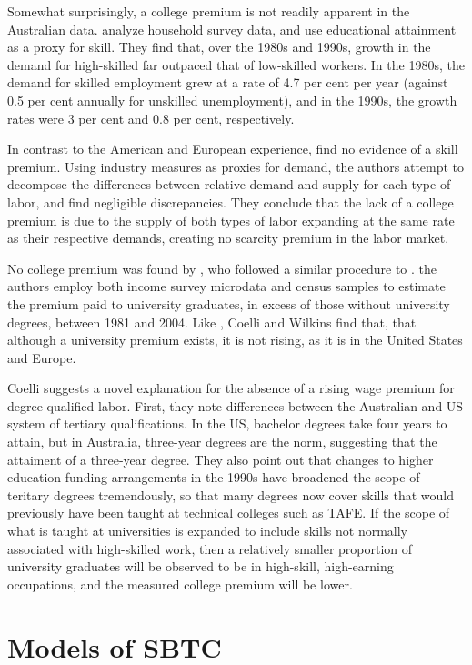 Somewhat surprisingly, a college premium is not readily apparent in the Australian data. \citet{Barnes2002} analyze household survey data, and use educational attainment as a proxy for skill. They find that, over the 1980s and 1990s, growth in the demand for high-skilled far outpaced that of low-skilled workers. In the 1980s, the demand for skilled employment grew at a rate of 4.7 per cent per year (against 0.5 per cent annually for unskilled unemployment), and in the 1990s, the growth rates were 3 per cent and 0.8 per cent, respectively.

In contrast to the American and European experience, \citet{Barnes2002} find no evidence of a skill premium. Using industry measures as proxies for demand, the authors attempt to decompose the differences between relative demand and supply for each type of labor, and find negligible discrepancies. They conclude that the lack of a college premium  is due to the supply of both types of labor expanding at the same rate as their respective demands, creating no scarcity premium in the labor market.

No college premium was found by \citet{Coelli2009}, who followed a similar procedure to \citet{Katz1992}. the authors employ both income survey microdata and census samples to estimate the premium paid to university graduates, in excess of those without university degrees, between 1981 and 2004. Like \citet{Barnes2002}, Coelli and Wilkins find that, that although a university premium exists, it is not rising, as it is in the United States and Europe.

Coelli suggests a novel explanation for the absence of a rising wage premium for degree-qualified labor. First, they note differences between the Australian and US system of tertiary qualifications. In the US, bachelor degrees take four years to attain, but in Australia, three-year degrees are the norm, suggesting that the attaiment of a three-year degree. They also point out that changes to higher education funding arrangements in the 1990s have broadened the scope of teritary degrees tremendously, so that many degrees now cover skills that would previously have been taught at technical colleges such as TAFE. If the scope of what is taught at universities is expanded to include skills not normally associated with high-skilled work, then a relatively smaller proportion of university graduates will be observed to be in high-skill, high-earning occupations, and the measured college premium will be lower.

\section{Models of SBTC}

